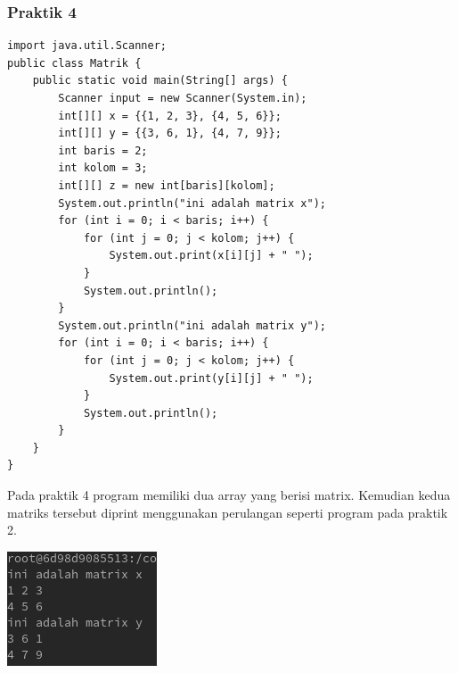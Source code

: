 \documentclass[a4paper,12pt]{article}
\begin{document}
\subsubsection{Praktik 4}
\begin{lstlisting}
import java.util.Scanner;
public class Matrik {
    public static void main(String[] args) {
        Scanner input = new Scanner(System.in);
        int[][] x = {{1, 2, 3}, {4, 5, 6}};
        int[][] y = {{3, 6, 1}, {4, 7, 9}};
        int baris = 2;
        int kolom = 3;
        int[][] z = new int[baris][kolom];
        System.out.println("ini adalah matrix x");
        for (int i = 0; i < baris; i++) {
            for (int j = 0; j < kolom; j++) {
                System.out.print(x[i][j] + " ");
            }
            System.out.println();
        }
        System.out.println("ini adalah matrix y");
        for (int i = 0; i < baris; i++) {
            for (int j = 0; j < kolom; j++) {
                System.out.print(y[i][j] + " ");
            }
            System.out.println();
        }
    }
}
\end{lstlisting}
Pada praktik 4 program memiliki dua array yang berisi matrix. Kemudian kedua matriks tersebut diprint menggunakan perulangan seperti program pada praktik 2.
\begin{center}
    \includegraphics{4.png}
\end{center}
\end{document}
